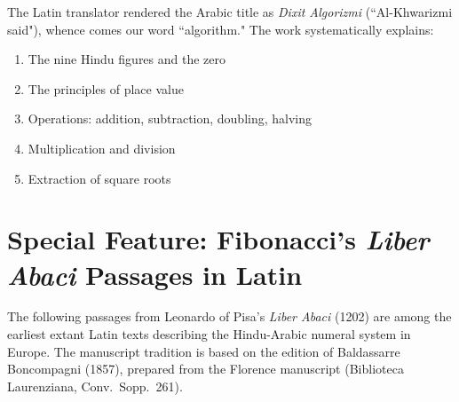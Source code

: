 \documentclass[11pt,a4paper]{article}
\begin{document}
The Latin translator rendered the Arabic title as \textit{Dixit Algorizmi} (``Al-Khwarizmi said"), whence comes our word ``algorithm." The work systematically explains:
\begin{enumerate}[leftmargin=2em,itemsep=0.3ex]
\item The nine Hindu figures and the zero
\item The principles of place value
\item Operations: addition, subtraction, doubling, halving
\item Multiplication and division
\item Extraction of square roots
\end{enumerate}

\vspace{0.5cm}

\section*{Special Feature: Fibonacci's \textit{Liber Abaci} Passages in Latin}

The following passages from Leonardo of Pisa's \textit{Liber Abaci} (1202) are among the earliest extant Latin texts describing the Hindu-Arabic numeral system in Europe. The manuscript tradition is based on the edition of Baldassarre Boncompagni (1857), prepared from the Florence manuscript (Biblioteca Laurenziana, Conv.\ Sopp.~261).
\end{document}

